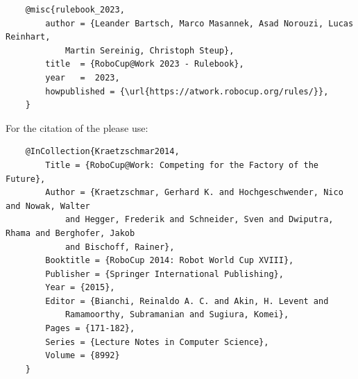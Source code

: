 \begin{titlepage}
\begin{minipage}{\textwidth}
\begin{verbatim}
	@misc{rulebook_2023,
		author = {Leander Bartsch, Marco Masannek, Asad Norouzi, Lucas Reinhart, 
			Martin Sereinig, Christoph Steup},
		title  = {RoboCup@Work 2023 - Rulebook},
		year   =  2023,
		howpublished = {\url{https://atwork.robocup.org/rules/}},
	}
\end{verbatim}


For the citation of the \RCAW please use:
\begin{verbatim}
	@InCollection{Kraetzschmar2014,
		Title = {RoboCup@Work: Competing for the Factory of the Future},
		Author = {Kraetzschmar, Gerhard K. and Hochgeschwender, Nico and Nowak, Walter
			and Hegger, Frederik and Schneider, Sven and Dwiputra, Rhama and Berghofer, Jakob
			and Bischoff, Rainer},
		Booktitle = {RoboCup 2014: Robot World Cup XVIII},
		Publisher = {Springer International Publishing},
		Year = {2015},
		Editor = {Bianchi, Reinaldo A. C. and Akin, H. Levent and
			Ramamoorthy, Subramanian and Sugiura, Komei},
		Pages = {171-182},
		Series = {Lecture Notes in Computer Science},
		Volume = {8992}
	}
\end{verbatim}
\end{minipage}




\end{titlepage}
